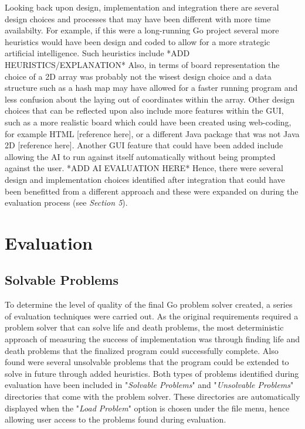 \documentclass{l3proj}
\begin{document}
Looking back upon design, implementation and integration there are several design choices and processes that may have been different with more time availabilty. For example, if this were a long-running Go project several more heuristics would have been design and coded to allow for a more strategic artificial intelligence. Such heuristics include *ADD HEURISTICS/EXPLANATION* Also, in terms of board representation the choice of a 2D array was probably not the wisest design choice and a data structure such as a hash map may have allowed for a faster running program and less confusion about the laying out of coordinates within the array. Other design choices that can be reflected upon also include more features within the GUI, such as a more realistic board which could have been created using web-coding, for example HTML [reference here], or a different Java package that was not Java 2D [reference here]. Another GUI feature that could have been added include allowing the AI to run against itself automatically without being prompted against the user. *ADD AI EVALUATION HERE* Hence, there were several design and implementation choices identified after integration that could have been benefitted from a different approach and these were expanded on during the evaluation process (see \textit{Section 5}).

\chapter{Evaluation}
\label{evaluation}

\section{Solvable Problems}

To determine the level of quality of the final Go problem solver created, a series of evaluation techniques were carried out. As the original requirements required a problem solver that can solve life and death problems, the most deterministic approach of measuring the success of implementation was through finding life and death problems that the finalized program could successfully complete. Also found were several unsolvable problems that the program could be extended to solve in future through added heuristics. Both types of problems identified during evaluation have been included in "\textit{Solvable Problems}" and "\textit{Unsolvable Problems}" directories that come with the problem solver. These directories are automatically displayed when the "\textit{Load Problem}" option is chosen under the file menu, hence allowing user access to the problems found during evaluation.
\end{document}
